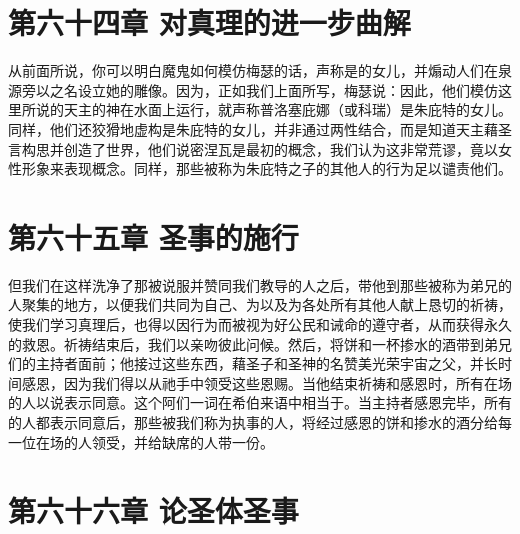 
\section{第六十四章 对真理的进一步曲解}

从前面所说，你可以明白魔鬼如何模仿梅瑟的话，声称是的女儿，并煽动人们在泉源旁以之名设立她的雕像。因为，正如我们上面所写，梅瑟说：因此，他们模仿这里所说的天主的神在水面上运行，就声称普洛塞庇娜（或科瑞）是朱庇特的女儿。同样，他们还狡猾地虚构是朱庇特的女儿，并非通过两性结合，而是知道天主藉圣言构思并创造了世界，他们说密涅瓦是最初的概念，我们认为这非常荒谬，竟以女性形象来表现概念。同样，那些被称为朱庇特之子的其他人的行为足以谴责他们。\par


\section{第六十五章 圣事的施行}

但我们在这样洗净了那被说服并赞同我们教导的人之后，带他到那些被称为弟兄的人聚集的地方，以便我们共同为自己、为以及为各处所有其他人献上恳切的祈祷，使我们学习真理后，也得以因行为而被视为好公民和诫命的遵守者，从而获得永久的救恩。祈祷结束后，我们以亲吻彼此问候。然后，将饼和一杯掺水的酒带到弟兄们的主持者面前；他接过这些东西，藉圣子和圣神的名赞美光荣宇宙之父，并长时间感恩，因为我们得以从祂手中领受这些恩赐。当他结束祈祷和感恩时，所有在场的人以说表示同意。这个阿们一词在希伯来语中相当于。当主持者感恩完毕，所有的人都表示同意后，那些被我们称为执事的人，将经过感恩的饼和掺水的酒分给每一位在场的人领受，并给缺席的人带一份。\par


\section{第六十六章 论圣体圣事}


